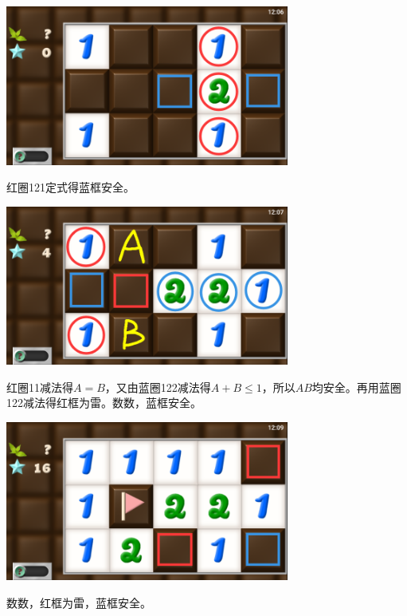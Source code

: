 \subsection{} %
\begin{center}
    \includegraphics[width=0.7\textwidth]{puzzle/80-1.png}
\end{center}
红圈121定式得蓝框安全。
\begin{center}
    \includegraphics[width=0.7\textwidth]{puzzle/80-2.png}
\end{center}
红圈11减法得$A=B$，又由蓝圈122减法得$A+B\le 1$，所以$AB$均安全。再用蓝圈122减法得红框为雷。数数，蓝框安全。
\begin{center}
    \includegraphics[width=0.7\textwidth]{puzzle/80-3.png}
\end{center}
数数，红框为雷，蓝框安全。

